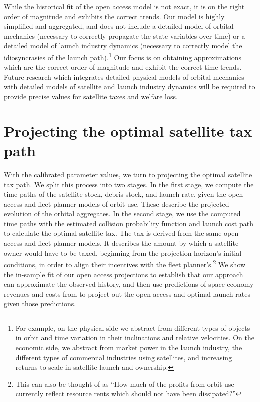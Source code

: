 \documentclass[12pt]{article}
\begin{document}
While the historical fit of the open access model is not exact, it is on the right order of magnitude and exhibits the correct trends. Our model is highly simplified and aggregated, and does not include a detailed model of orbital mechanics (necessary to correctly propagate the state variables over time) or a detailed model of launch industry dynamics (necessary to correctly model the idiosyncrasies of the launch path).\footnote{For example, on the physical side we abstract from different types of objects in orbit and time variation in their inclinations and relative velocities. On the economic side, we abstract from market power in the launch industry, the different types of commercial industries using satellites, and increasing returns to scale in satellite launch and ownership.} Our focus is on obtaining approximations which are the correct order of magnitude and exhibit the correct time trends. Future research which integrates detailed physical models of orbital mechanics with detailed models of satellite and launch industry dynamics will be required to provide precise values for satellite taxes and welfare loss.

\section{Projecting the optimal satellite tax path}

With the calibrated parameter values, we turn to projecting the optimal satellite tax path. We split this process into two stages. In the first stage, we compute the time paths of the satellite stock, debris stock, and launch rate, given the open access and fleet planner models of orbit use. These describe the projected evolution of the orbital aggregates. In the second stage, we use the computed time paths with the estimated collision probability function and launch cost path to calculate the optimal satellite tax. The tax is derived from the same open access and fleet planner models. It describes the amount by which a satellite owner would have to be taxed, beginning from the projection horizon's initial conditions, in order to align their incentives with the fleet planner's.\footnote{This can also be thought of as ``How much of the profits from orbit use currently reflect resource rents which should not have been dissipated?'' } We show the in-sample fit of our open access projections to establish that our approach can approximate the observed history, and then use predictions of space economy revenues and costs from \citep{MSreport} to project out the open access and optimal launch rates given those predictions. \\
\end{document}
